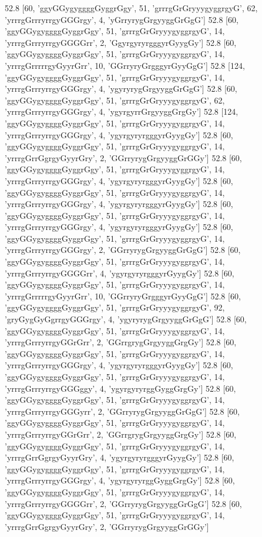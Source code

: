 52.8 [60, 'ggyGGygyggggGyggrGgy', 51, 'grrrgGrGryyygyggrgyG', 62, 'yrrrgGrrryrrgyGGGrgy', 4, 'yGrryrygGrgyyggGrGgG']
52.8 [60, 'ggyGGygyggggGyggrGgy', 51, 'grrrgGrGryyygyggrgyG', 14, 'yrrrgGrrryrrgyGGGGrr', 2, 'GgyrgyryrgggyrGyygGy']
52.8 [60, 'ggyGGygyggggGyggrGgy', 51, 'grrrgGrGryyygyggrgyG', 14, 'yrrrgGrrrrrgyGyyrGrr', 10, 'GGrryryGrgggyrGyyGgG']
52.8 [124, 'ggyGGygyggggGyggrGgy', 51, 'grrrgGrGryyygyggrgyG', 14, 'yrrrgGrrryrrgyGGGrgy', 4, 'ygyryrygGrgyyggGrGgG']
52.8 [60, 'ggyGGygyggggGyggrGgy', 51, 'grrrgGrGryyygyggrgyG', 62, 'yrrrgGrrryrrgyGGGrgy', 4, 'ygyrgyrrGrgyyggGrgGy']
52.8 [124, 'ggyGGygyggggGyggrGgy', 51, 'grrrgGrGryyygyggrgyG', 14, 'yrrrgGrrryrrgyGGGrgy', 4, 'ygyrgyryrgggyrGyygGy']
52.8 [60, 'ggyGGygyggggGyggrGgy', 51, 'grrrgGrGryyygyggrgyG', 14, 'yrrrgGrrGgrgyGyyrGry', 2, 'GGrryrygGrgyyggGrGGy']
52.8 [60, 'ggyGGygyggggGyggrGgy', 51, 'grrrgGrGryyygyggrgyG', 14, 'yrrrgGrrryrrgyGGGrgy', 4, 'ygyrgyryrgggyrGyygGy']
52.8 [60, 'ggyGGygyggggGyggrGgy', 51, 'grrrgGrGryyygyggrgyG', 14, 'yrrrgGrrryrrgyGGGrgy', 4, 'ygyrgyryrgggyrGyygGy']
52.8 [60, 'ggyGGygyggggGyggrGgy', 51, 'grrrgGrGryyygyggrgyG', 14, 'yrrrgGrrryrrgyGGGrgy', 4, 'ygyrgyryrgggyrGyygGy']
52.8 [60, 'ggyGGygyggggGyggrGgy', 51, 'grrrgGrGryyygyggrgyG', 14, 'yrrrgGrrryrrgyGGGrgy', 2, 'GGrryrygGrgyyggGrGgG']
52.8 [60, 'ggyGGygyggggGyggrGgy', 51, 'grrrgGrGryyygyggrgyG', 14, 'yrrrgGrrryrrgyGGGGrr', 4, 'ygyrgyryrgggyrGyygGy']
52.8 [60, 'ggyGGygyggggGyggrGgy', 51, 'grrrgGrGryyygyggrgyG', 14, 'yrrrgGrrrrrgyGyyrGrr', 10, 'GGrryryGrgggyrGyyGgG']
52.8 [60, 'ggyGGygyggggGyggrGgy', 51, 'grrrgGrGryyygyggrgyG', 92, 'gryGygGyGgrrgyGGGrgy', 4, 'ygyryrygGrgyyggGrGgG']
52.8 [60, 'ggyGGygyggggGyggrGgy', 51, 'grrrgGrGryyygyggrgyG', 14, 'yrrrgGrrryrrgyGGrGrr', 2, 'GGrrgrygGrgyyggGrgGy']
52.8 [60, 'ggyGGygyggggGyggrGgy', 51, 'grrrgGrGryyygyggrgyG', 14, 'yrrrgGrrryrrgyGGGrgy', 4, 'ygyrgyryrgggyrGyygGy']
52.8 [60, 'ggyGGygyggggGyggrGgy', 51, 'grrrgGrGryyygyggrgyG', 14, 'yrrrgGrrryrrgyGGGggy', 4, 'ygyrgyryrggGyggGrgGy']
52.8 [60, 'ggyGGygyggggGyggrGgy', 51, 'grrrgGrGryyygyggrgyG', 14, 'yrrrgGrrryrrgyGGGyrr', 2, 'GGrryrygGrgyyggGrGgG']
52.8 [60, 'ggyGGygyggggGyggrGgy', 51, 'grrrgGrGryyygyggrgyG', 14, 'yrrrgGrrryrrgyGGrGrr', 2, 'GGrrgrygGrgyyggGrgGy']
52.8 [60, 'ggyGGygyggggGyggrGgy', 51, 'grrrgGrGryyygyggrgyG', 14, 'yrrrgGrrGgrgyGyyrGry', 4, 'ygyrgyryrgggyrGyygGy']
52.8 [60, 'ggyGGygyggggGyggrGgy', 51, 'grrrgGrGryyygyggrgyG', 14, 'yrrrgGrrryrrgyGGGrgy', 4, 'ygyrgyryrggGyggGrgGy']
52.8 [60, 'ggyGGygyggggGyggrGgy', 51, 'grrrgGrGryyygyggrgyG', 14, 'yrrrgGrrryrrgyGGGGrr', 2, 'GGrryrygGrgyyggGrGgG']
52.8 [60, 'ggyGGygyggggGyggrGgy', 51, 'grrrgGrGryyygyggrgyG', 14, 'yrrrgGrrGgrgyGyyrGry', 2, 'GGrryrygGrgyyggGrGGy']
